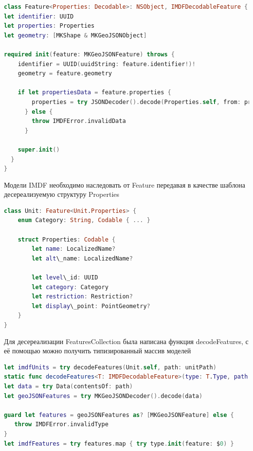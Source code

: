     \begin{lstlisting}[language=swift,caption={Реализация класса Feature}]
class Feature<Properties: Decodable>: NSObject, IMDFDecodableFeature {
let identifier: UUID
let properties: Properties
let geometry: [MKShape & MKGeoJSONObject]

required init(feature: MKGeoJSONFeature) throws {
    identifier = UUID(uuidString: feature.identifier!)!
    geometry = feature.geometry

    if let propertiesData = feature.properties {
        properties = try JSONDecoder().decode(Properties.self, from: propertiesData)
      } else {
        throw IMDFError.invalidData
      }

    super.init()
  }
}
  \end{lstlisting}

    Модели IMDF необходимо наследовать от Feature передавая в качестве шаблона десереализуемую структуру Properties

    \begin{lstlisting}[language=swift,caption={Пример объявления модели Unit}]
class Unit: Feature<Unit.Properties> {
    enum Category: String, Codable { ... }

    struct Properties: Codable {
        let name: LocalizedName?
        let alt\_name: LocalizedName?

        let level\_id: UUID
        let category: Category
        let restriction: Restriction?
        let display\_point: PointGeometry?
    }
}
    \end{lstlisting}

    Для десереализации FeaturesCollection была написана функция decodeFeatures, с её помощью можно получить типизированный массив моделей

    \begin{lstlisting}[language=swift,caption={Пример десереализации массива комнат Units}]
let imdfUnits = try decodeFeatures(Unit.self, path: unitPath)
static func decodeFeatures<T: IMDFDecodableFeature>(type: T.Type, path: URL) throws -> [T] {
let data = try Data(contentsOf: path)
let geoJSONFeatures = try MKGeoJSONDecoder().decode(data)

guard let features = geoJSONFeatures as? [MKGeoJSONFeature] else {
   throw IMDFError.invalidType 
}
let imdfFeatures = try features.map { try type.init(feature: $0) }
  \end{lstlisting}

